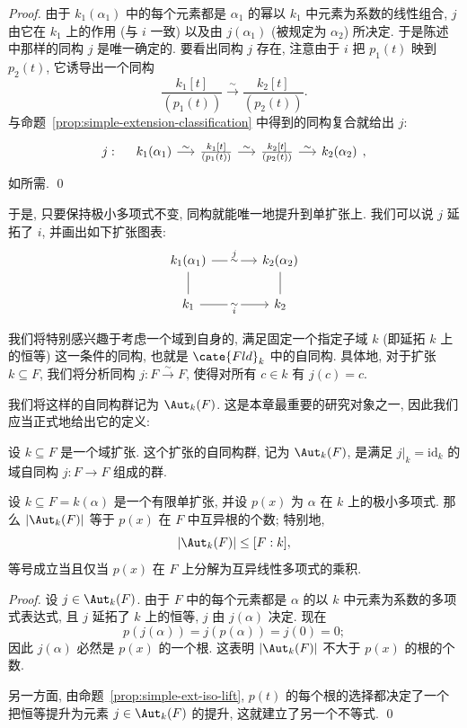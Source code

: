 \begin{proof}
由于 $k_1(\alpha_1)$ 中的每个元素都是 $\alpha_1$ 的幂以 $k_1$ 中元素为系数的线性组合, $j$ 由它在 $k_1$ 上的作用 (与 $i$ 一致) 以及由 $j(\alpha_1)$ (被规定为 $\alpha_2$) 所决定. 于是陈述中那样的同构 $j$ 是唯一确定的.
要看出同构 $j$ 存在, 注意由于 $i$ 把 $p_1(t)$ 映到 $p_2(t)$, 它诱导出一个同构
\[
\frac{k_1[t]}{(p_1(t))}\xrightarrow{\sim}\frac{k_2[t]}{(p_2(t))}.
\]
与命题~\ref{prop:simple-extension-classification} 中得到的同构复合就给出 $j$:
\[
j:\quad\begin{tikzcd}[column sep=1.4em]
k_1(\alpha_1) \ar[r,"\sim"] & \frac{k_1[t]}{(p_1(t))} \ar[r,"\sim"] & \frac{k_2[t]}{(p_2(t))} \ar[r,"\sim"] & k_2(\alpha_2)
\end{tikzcd},
\]
如所需. \qed
\end{proof}

于是, 只要保持极小多项式不变, 同构就能唯一地提升到单扩张上. 我们可以说 $j$ 延拓了 $i$, 并画出如下扩张图表:
\[
\begin{tikzcd}[column sep=large]
k_1(\alpha_1) \ar[r, "\sim" description, "j"] \ar[d,no head] & k_2(\alpha_2) \ar[d,no head] \\
k_1 \ar[r, "\sim" description, "i"'] & k_2
\end{tikzcd}
\]

我们将特别感兴趣于考虑一个域到自身的, 满足固定一个指定子域 $k$ (即延拓 $k$ 上的恒等) 这一条件的同构, 也就是 $\cate{Fld}_k$ 中的自同构. 具体地, 对于扩张 $k\subseteq F$, 我们将分析同构 $j:F\xrightarrow{\sim}F$, 使得对所有 $c\in k$ 有 $j(c)=c$.

我们将这样的自同构群记为 $\Aut_k(F)$. 这是本章最重要的研究对象之一, 因此我们应当正式地给出它的定义:

\begin{definition}\label{def:aut-k}
设 $k\subseteq F$ 是一个域扩张. 这个扩张的自同构群, 记为 $\Aut_k(F)$, 是满足 $j|_k=\mathrm{id}_k$ 的域自同构 $j:F\to F$ 组成的群.
\end{definition}

\begin{corollary}\label{cor:autk-count}
设 $k\subseteq F=k(\alpha)$ 是一个有限单扩张, 并设 $p(x)$ 为 $\alpha$ 在 $k$ 上的极小多项式. 那么 $|\Aut_k(F)|$ 等于 $p(x)$ 在 $F$ 中互异根的个数; 特别地,
\[
|\Aut_k(F)|\leq [F:k],
\]
等号成立当且仅当 $p(x)$ 在 $F$ 上分解为互异线性多项式的乘积.
\end{corollary}

\begin{proof}
设 $j\in\Aut_k(F)$. 由于 $F$ 中的每个元素都是 $\alpha$ 的以 $k$ 中元素为系数的多项式表达式, 且 $j$ 延拓了 $k$ 上的恒等, $j$ 由 $j(\alpha)$ 决定. 现在
\[
p(j(\alpha))=j(p(\alpha))=j(0)=0;
\]
因此 $j(\alpha)$ 必然是 $p(x)$ 的一个根. 这表明 $|\Aut_k(F)|$ 不大于 $p(x)$ 的根的个数.

另一方面, 由命题~\ref{prop:simple-ext-iso-lift}, $p(t)$ 的每个根的选择都决定了一个把恒等提升为元素 $j\in\Aut_k(F)$ 的提升, 这就建立了另一个不等式. \qed
\end{proof}

